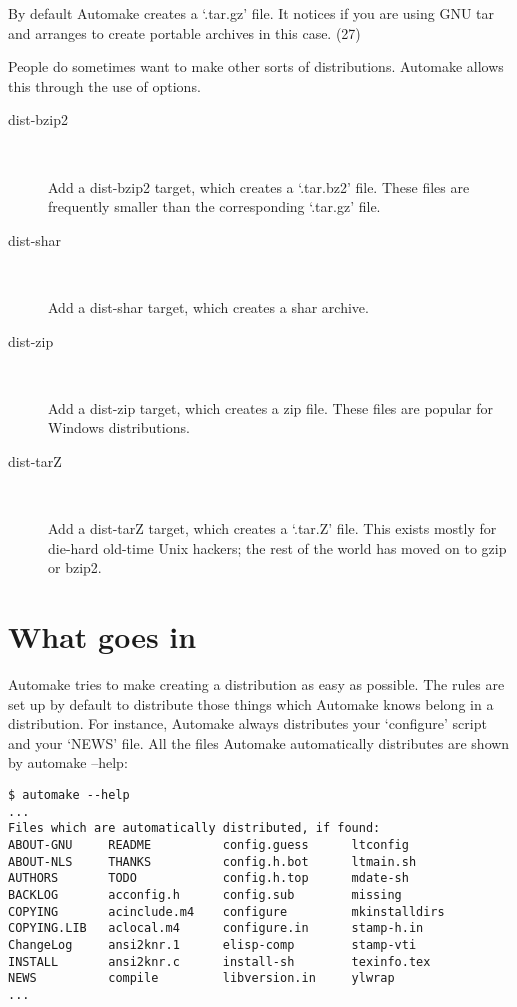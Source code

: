 By default Automake creates a `.tar.gz' file. It notices if you are using GNU tar and arranges to create portable archives in this case. (27)

People do sometimes want to make other sorts of distributions. Automake allows this through the use of options. 

\begin{description}
\item[dist-bzip2]
\ 

    Add a dist-bzip2 target, which creates a `.tar.bz2' file. These files are frequently smaller than the corresponding `.tar.gz' file.

\item[dist-shar]
\ 

    Add a dist-shar target, which creates a shar archive.

\item[dist-zip]
\ 

    Add a dist-zip target, which creates a zip file. These files are popular for Windows distributions.

\item[dist-tarZ]
\ 

    Add a dist-tarZ target, which creates a `.tar.Z' file. This exists mostly for die-hard old-time Unix hackers; the rest of the world has moved on to gzip or bzip2.
\end{description}

\section{What goes in}

Automake tries to make creating a distribution as easy as possible. The rules are set up by default to distribute those things which Automake knows belong in a distribution. For instance, Automake always distributes your `configure' script and your `NEWS' file. All the files Automake automatically distributes are shown by automake --help:

\begin{Verbatim}[frame=single]
$ automake --help
...
Files which are automatically distributed, if found:
ABOUT-GNU     README          config.guess      ltconfig
ABOUT-NLS     THANKS          config.h.bot      ltmain.sh
AUTHORS       TODO            config.h.top      mdate-sh
BACKLOG       acconfig.h      config.sub        missing
COPYING       acinclude.m4    configure         mkinstalldirs
COPYING.LIB   aclocal.m4      configure.in      stamp-h.in
ChangeLog     ansi2knr.1      elisp-comp        stamp-vti
INSTALL       ansi2knr.c      install-sh        texinfo.tex
NEWS          compile         libversion.in     ylwrap
...
\end{Verbatim}

